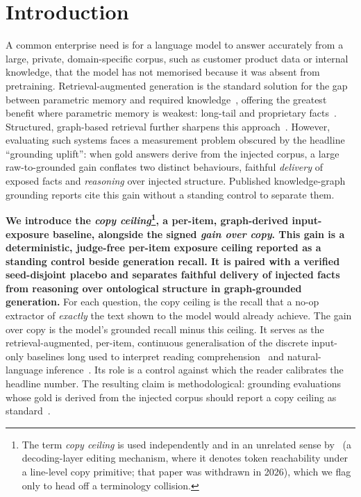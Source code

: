 \documentclass[10pt,twocolumn]{article}
\begin{document}
\section{Introduction}\label{sec:intro}
A common enterprise need is for a language model to answer accurately from a large, private, domain-specific corpus, such as customer product data or internal knowledge, that the model has not memorised because it was absent from pretraining. Retrieval-augmented generation is the standard solution for the gap between parametric memory and required knowledge~\cite{lewis2020rag,gao2023ragsurvey}, offering the greatest benefit where parametric memory is weakest: long-tail and proprietary facts~\cite{mallen2023trust}. Structured, graph-based retrieval further sharpens this approach~\cite{edge2024graphrag,guo2024lightrag,baek2023kaping,pan2024unifying}. However, evaluating such systems faces a measurement problem obscured by the headline ``grounding uplift'': when gold answers derive from the injected corpus, a large raw-to-grounded gain conflates two distinct behaviours, faithful \emph{delivery} of exposed facts and \emph{reasoning} over injected structure. Published knowledge-graph grounding reports cite this gain without a standing control to separate them.

\textbf{We introduce the \emph{copy ceiling}\footnote{The term \emph{copy ceiling} is used independently and in an unrelated sense by~\textcite{copyasdecode2026} (a decoding-layer editing mechanism, where it denotes token reachability under a line-level copy primitive; that paper was withdrawn in 2026), which we flag only to head off a terminology collision.}, a per-item, graph-derived input-exposure baseline, alongside the signed \emph{gain over copy}. This gain is a deterministic, judge-free per-item exposure ceiling reported as a standing control beside generation recall. It is paired with a verified seed-disjoint placebo and separates faithful delivery of injected facts from reasoning over ontological structure in graph-grounded generation.} For each question, the copy ceiling is the recall that a no-op extractor of \emph{exactly} the text shown to the model would already achieve. The gain over copy is the model's grounded recall minus this ceiling. It serves as the retrieval-augmented, per-item, continuous generalisation of the discrete input-only baselines long used to interpret reading comprehension~\cite{kaushik2018reading} and natural-language inference~\cite{gururangan2018artifacts,poliak2018hypothesis}. Its role is a control against which the reader calibrates the headline number. The resulting claim is methodological: grounding evaluations whose gold is derived from the injected corpus should report a copy ceiling as standard~\cite{laitenberger2025stronger,min2023factscore}.
\end{document}
